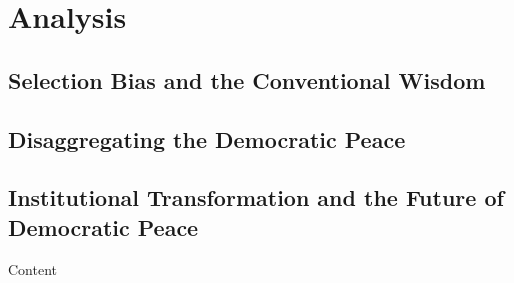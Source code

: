 \documentclass{beamer}
\begin{document}
	\section{Analysis}
	
	\subsection{Selection Bias and the Conventional Wisdom}
	
	\subsection{Disaggregating the Democratic Peace}
	
	\subsection{Institutional Transformation and the Future of Democratic Peace}
	
	\begin{frame}
		Content
	\end{frame}
	
\end{document}
